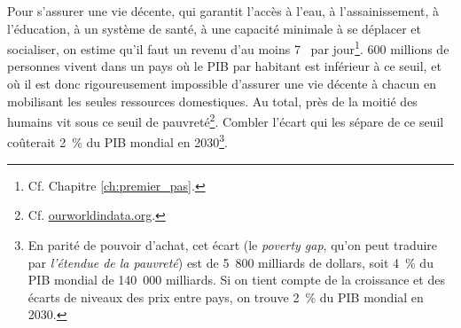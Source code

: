 \documentclass[a5paper,french,openany]{memoir}
\begin{document}
Pour s'assurer une vie décente, qui garantit l'accès à l'eau, à l'assainissement, à l'éducation, à un système de santé, à une capacité minimale à se déplacer et socialiser, on estime qu'il faut un revenu d'au moins 7~\textit{\texteuro{}} par jour\footnote{Cf. Chapitre \ref{ch:premier_pas}.}. 
600 millions de personnes vivent dans un pays où le PIB par habitant est inférieur à ce seuil, et où il est donc rigoureusement impossible d'assurer une vie décente à chacun en mobilisant les seules ressources domestiques. 
Au total, près de la moitié des humains vit sous ce seuil de pauvreté\footnote{Cf. \href{https://ourworldindata.org/grapher/distribution-of-population-between-different-poverty-thresholds-up-to-30-dollars}{ourworldindata.org}.}. Combler l'écart qui les sépare de ce seuil coûterait 2~\% du PIB mondial en 2030\footnote{En parité de pouvoir d'achat, cet écart (le \textit{poverty gap}, qu'on peut traduire par \textit{l'étendue de la pauvreté}) est de 5~800 milliards de dollars, soit 4~\% du PIB mondial de 140~000 milliards. Si on tient compte de la croissance et des écarts de niveaux des prix entre pays, on trouve %
2~\% du PIB mondial en 2030.}. %
\end{document}
